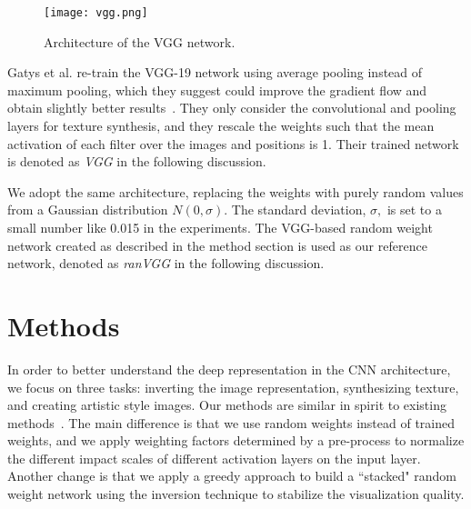 \documentclass{article}
\begin{document}
\begin{figure}[htbp]
\centering
\vspace{-0.5em}
\texttt{[image: vgg.png]}
\vspace{-1em}
\caption{Architecture of the VGG network.}
\vspace{-0.5em}
\label{Fig:VGG}
\end{figure}

Gatys et al. re-train the VGG-19 network using average pooling instead of maximum pooling, which they suggest could improve the gradient flow and obtain slightly better results~\cite{Gatys2015texture}.
 They only consider the convolutional and pooling layers for texture synthesis, and they rescale the weights such that the mean activation of each filter over the images and positions is 1. Their trained network is denoted as \emph{VGG} in the following discussion.

We adopt the same architecture, replacing the weights with purely random values from a Gaussian distribution $N(0, \sigma)$. The standard deviation, $\sigma,$ is set to a small number like 0.015 in the experiments.
The VGG-based random weight network created as described in the method section is used as our reference network, denoted as \emph{ranVGG} in the following discussion.



\vspace{-0.5em}
\section{Methods}
\label{sec:methods}
%

In order to better understand the deep representation in the CNN architecture,
we focus on three tasks: inverting the image representation, synthesizing  texture, and creating artistic style images.
Our methods are similar in spirit to existing methods~\cite{Mahendran2015CVPR, Gatys2015texture,Gatys2015Style}.
The main difference is that we use random weights instead of trained weights, and we apply weighting factors determined by a pre-process to normalize the different impact scales of different activation layers on the input layer.
Another change is that we apply a greedy approach to build a ``stacked" random weight network using the inversion technique to stabilize the visualization quality.

\end{document}
